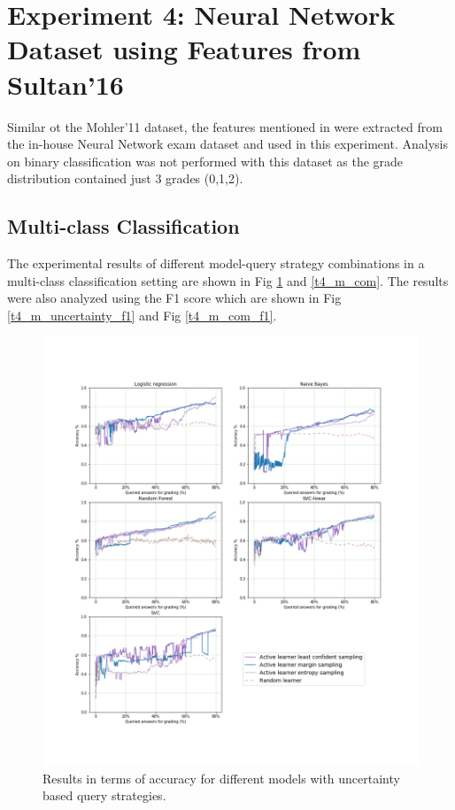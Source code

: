 
\section{Experiment 4: Neural Network Dataset using Features from Sultan'16}

Similar ot the Mohler'11 dataset, the features mentioned in \cite{Sultan2016} were extracted from the in-house Neural Network exam dataset and used in this experiment. Analysis on binary classification was not performed with this dataset as the grade distribution contained just 3 grades (0,1,2).

\subsection{Multi-class Classification}

The experimental results of different model-query strategy combinations in a multi-class classification setting are shown in Fig \ref{t4_m_uncertainty} and \ref{t4_m_com}. The results were also analyzed using the F1 score which are shown in Fig \ref{t4_m_uncertainty_f1} and Fig \ref{t4_m_com_f1}.

\begin{figure}[!htb]
	\centering
	\includegraphics[scale=0.45]{images/task4_accuracy_uncertainty}
	\caption{Results in terms of accuracy for different models with uncertainty based query strategies.}
	\label{t4_m_uncertainty}
\end{figure}

